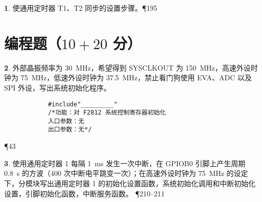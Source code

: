 \documentclass{ctexart}
\theoremstyle{definition}
\newtheorem{ti}{}[section]
\begin{document}
	\begin{ti}
		使通用定时器 T1、T2 同步的设置步骤。\P195
	\end{ti}

	\section{编程题（$10 + 20$ 分）}
	\begin{ti}
		外部晶振频率为 \SI{30}{MHz}，希望得到 SYSCLKOUT 为 \SI{150}{MHz}，高速外设时钟为 \SI{75}{MHz}，低速外设时钟为 \SI{37.5}{MHz}，禁止看门狗使用 EVA、ADC 以及 SPI 外设，写出系统初始化程序。
		\begin{verbatim}
			#include"_________"
			/*功能：对 F2812 系统控制寄存器初始化
			入口参数：无
			出口参数：无*/
		\end{verbatim}
		\P43
	\end{ti}

	\begin{ti}
		使用通用定时器 1 每隔 \SI{1}{ms} 发生一次中断，在 GPIOB0 引脚上产生周期 \SI{0.8}{s} 的方波（400 次中断电平跳变一次）；在高速外设时钟为 \SI{75}{MHz} 的设定下，分模块写出通用定时器 1 的初始化设置函数，系统初始化调用和中断初始化设置，引脚初始化函数，中断服务函数。
		\P210--211
	\end{ti}
\end{document}
